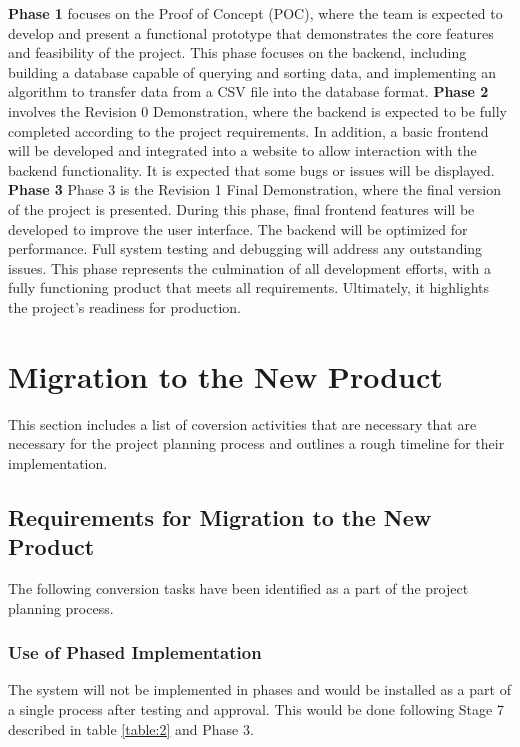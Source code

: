 \documentclass[12pt]{article}
\begin{document}
\noindent\textbf{Phase 1} focuses on the Proof of Concept (POC), where the team
is expected to develop and present a functional prototype that demonstrates the
core features and feasibility of the project. This phase focuses on the backend,
including building a database capable of querying and sorting data, and
implementing an algorithm to transfer data from a CSV file into the database
format.\newline\newline
\noindent\textbf{Phase 2} involves the Revision 0 Demonstration, where the
backend is expected to be fully completed according to the project requirements.
In addition, a basic frontend will be developed and integrated into a website to
allow interaction with the backend functionality. It is expected that some bugs
or issues will be displayed. \newline\newline
\noindent\textbf{Phase 3} Phase 3 is the Revision 1 Final Demonstration, where
the final version of the project is presented. During this phase, final frontend
features will be developed to improve the user interface. The backend will be
optimized for performance. Full system testing and debugging will address any
outstanding issues.  This phase represents the culmination of all development
efforts, with a fully functioning product that meets all requirements.
Ultimately, it highlights the project's readiness for production.

\section{Migration to the New Product}
This section includes a list of coversion activities that are necessary that are necessary for the project planning process and outlines a rough timeline for their implementation.
\subsection{Requirements for Migration to the New Product}
The following conversion tasks have been identified as a part of the project planning process.
\subsubsection{Use of Phased Implementation}
The system will not be implemented in phases and would be installed as a part of a single process after testing and approval. This would be done following Stage 7 described in table
\ref{table:2} and Phase 3.
\end{document}
